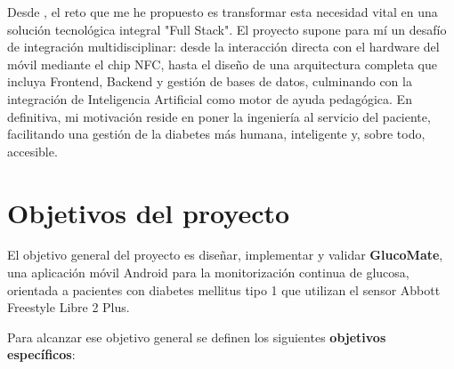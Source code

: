 Desde , el reto que me he propuesto es transformar esta necesidad vital en una solución tecnológica integral "Full Stack". El proyecto supone para mí un desafío de integración multidisciplinar: desde la interacción directa con el hardware del móvil mediante el chip NFC, hasta el diseño de una arquitectura completa que incluya Frontend, Backend y gestión de bases de datos, culminando con la integración de Inteligencia Artificial como motor de ayuda pedagógica. En definitiva, mi motivación reside en poner la ingeniería al servicio del paciente, facilitando una gestión de la diabetes más humana, inteligente y, sobre todo, accesible.

\section{Objetivos del proyecto}
\label{sec:objetivos}

El objetivo general del proyecto es diseñar, implementar y validar \textbf{GlucoMate},
una aplicación móvil Android para la monitorización continua de glucosa, orientada a
pacientes con diabetes mellitus tipo 1 que utilizan el sensor Abbott Freestyle Libre 2
Plus.

Para alcanzar ese objetivo general se definen los siguientes \textbf{objetivos
específicos}:

